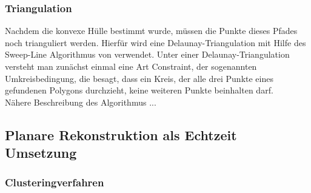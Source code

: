 \subsubsection{Triangulation}

Nachdem die konvexe Hülle bestimmt wurde, müssen die Punkte dieses Pfades noch trianguliert werden. Hierfür wird eine Delaunay-Triangulation mit Hilfe des Sweep-Line Algorithmus von \citet{domiter2008sweep} verwendet. Unter einer Delaunay-Triangulation versteht man zunächst einmal eine Art Constraint, der sogenannten Umkreisbedingung, die besagt, dass ein Kreis, der alle drei Punkte eines gefundenen Polygons durchzieht, keine weiteren Punkte beinhalten darf. \\

Nähere Beschreibung des Algorithmus ...

\subsection{Planare Rekonstruktion als Echtzeit Umsetzung}

\subsubsection{Clusteringverfahren}
